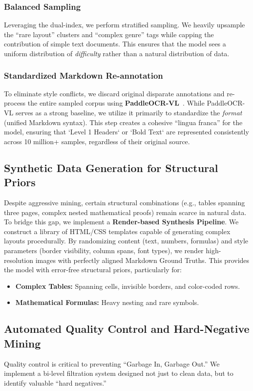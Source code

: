 \subsubsection{Balanced Sampling}
Leveraging the dual-index, we perform stratified sampling. We heavily upsample the ``rare layout'' clusters and ``complex genre'' tags while capping the contribution of simple text documents. This ensures that the model sees a uniform distribution of \textit{difficulty} rather than a natural distribution of data.

\subsubsection{Standardized Markdown Re-annotation}
To eliminate style conflicts, we discard original disparate annotations and re-process the entire sampled corpus using \textbf{PaddleOCR-VL}~\cite{cui2025paddleocr}. While PaddleOCR-VL serves as a strong baseline, we utilize it primarily to standardize the \textit{format} (unified Markdown syntax). This step creates a cohesive ``lingua franca'' for the model, ensuring that `Level 1 Headers` or `Bold Text` are represented consistently across 10 million+ samples, regardless of their original source.

\subsection{Synthetic Data Generation for Structural Priors}
Despite aggressive mining, certain structural combinations (e.g., tables spanning three pages, complex nested mathematical proofs) remain scarce in natural data. To bridge this gap, we implement a \textbf{Render-based Synthesis Pipeline}.
We construct a library of HTML/CSS templates capable of generating complex layouts procedurally. By randomizing content (text, numbers, formulas) and style parameters (border visibility, column spans, font types), we render high-resolution images with perfectly aligned Markdown Ground Truths. This provides the model with error-free structural priors, particularly for:
\begin{itemize}
    \item \textbf{Complex Tables:} Spanning cells, invisible borders, and color-coded rows.
    \item \textbf{Mathematical Formulas:} Heavy nesting and rare symbols.
\end{itemize}

\subsection{Automated Quality Control and Hard-Negative Mining}
Quality control is critical to preventing ``Garbage In, Garbage Out.'' We implement a bi-level filtration system designed not just to clean data, but to identify valuable ``hard negatives.''

